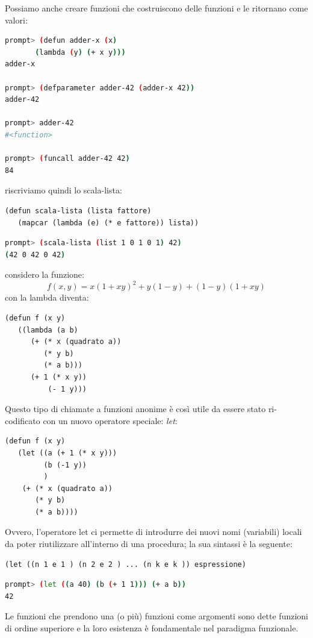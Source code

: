 \documentclass[a4paper,12pt, oneside]{book}
\begin{document}
Possiamo anche creare funzioni che costruiscono delle funzioni e le ritornano come valori:
\begin{shaded}
	\begin{lstlisting}[language=bash]
prompt> (defun adder-x (x)
       (lambda (y) (+ x y)))
adder-x

prompt> (defparameter adder-42 (adder-x 42))
adder-42

prompt> adder-42
#<function>

prompt> (funcall adder-42 42)
84
\end{lstlisting}
\end{shaded}
riscriviamo quindi lo scala-lista:
\begin{verbatim}
(defun scala-lista (lista fattore)
   (mapcar (lambda (e) (* e fattore)) lista))
\end{verbatim}
\begin{shaded}
	\begin{lstlisting}[language=bash]
prompt> (scala-lista (list 1 0 1 0 1) 42)
(42 0 42 0 42)
\end{lstlisting}
\end{shaded}
considero la funzione:
$$f(x, y) = x (1 + x y)^2 + y (1 - y) + (1 - y) (1 + x y)$$
con la lambda diventa:
\begin{verbatim}
(defun f (x y)
   ((lambda (a b)
      (+ (* x (quadrato a))
         (* y b)
         (* a b)))
      (+ 1 (* x y))
          (- 1 y)))
\end{verbatim}
Questo tipo di chiamate a funzioni anonime è così utile da essere stato ri-codificato
con un nuovo operatore speciale: \textit{let}:
\begin{verbatim}
(defun f (x y)
   (let ((a (+ 1 (* x y)))
         (b (-1 y))
         )
    (+ (* x (quadrato a))
       (* y b)
       (* a b))))
\end{verbatim}
Ovvero, l'operatore let ci permette di introdurre dei nuovi nomi (variabili) locali da
poter riutilizzare all'interno di una procedura; la sua sintassi è la seguente:
\begin{verbatim}
(let ((n 1 e 1 ) (n 2 e 2 ) ... (n k e k )) espressione)
\end{verbatim}
\begin{shaded}
	\begin{lstlisting}[language=bash]
prompt> (let ((a 40) (b (+ 1 1))) (+ a b))
42
\end{lstlisting}
\end{shaded}
Le funzioni che prendono una (o più) funzioni come argomenti
sono dette funzioni di ordine superiore e la loro esistenza è fondamentale nel paradigma funzionale.\\
\end{document}
